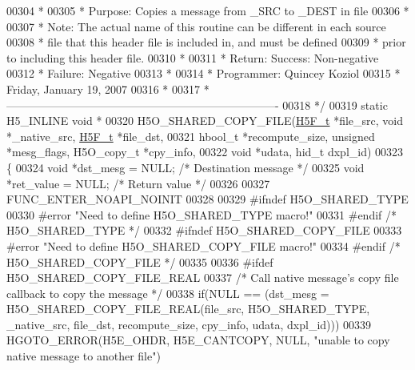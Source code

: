 \begin{DoxyCode}
00304 \textcolor{comment}{ *}
00305 \textcolor{comment}{ * Purpose:     Copies a message from \_SRC to \_DEST in file}
00306 \textcolor{comment}{ *}
00307 \textcolor{comment}{ * Note:    The actual name of this routine can be different in each source}
00308 \textcolor{comment}{ *      file that this header file is included in, and must be defined}
00309 \textcolor{comment}{ *      prior to including this header file.}
00310 \textcolor{comment}{ *}
00311 \textcolor{comment}{ * Return:  Success:    Non-negative}
00312 \textcolor{comment}{ *      Failure:    Negative}
00313 \textcolor{comment}{ *}
00314 \textcolor{comment}{ * Programmer:  Quincey Koziol}
00315 \textcolor{comment}{ *              Friday, January 19, 2007}
00316 \textcolor{comment}{ *}
00317 \textcolor{comment}{ *-------------------------------------------------------------------------}
00318 \textcolor{comment}{ */}
00319 \textcolor{keyword}{static} H5\_INLINE \textcolor{keywordtype}{void} *
00320 H5O\_SHARED\_COPY\_FILE(\hyperlink{struct_h5_f__t}{H5F\_t} *file\_src, \textcolor{keywordtype}{void} *\_native\_src, \hyperlink{struct_h5_f__t}{H5F\_t} *file\_dst,
00321     hbool\_t *recompute\_size, \textcolor{keywordtype}{unsigned} *mesg\_flags, H5O\_copy\_t *cpy\_info,
00322     \textcolor{keywordtype}{void} *udata, hid\_t dxpl\_id)
00323 \{
00324     \textcolor{keywordtype}{void} *dst\_mesg = NULL;      \textcolor{comment}{/* Destination message */}
00325     \textcolor{keywordtype}{void} *ret\_value = NULL;     \textcolor{comment}{/* Return value */}
00326 
00327     FUNC\_ENTER\_NOAPI\_NOINIT
00328 
00329 \textcolor{preprocessor}{#ifndef H5O\_SHARED\_TYPE}
00330 \textcolor{preprocessor}{#error "Need to define H5O\_SHARED\_TYPE macro!"}
00331 \textcolor{preprocessor}{#endif }\textcolor{comment}{/* H5O\_SHARED\_TYPE */}\textcolor{preprocessor}{}
00332 \textcolor{preprocessor}{#ifndef H5O\_SHARED\_COPY\_FILE}
00333 \textcolor{preprocessor}{#error "Need to define H5O\_SHARED\_COPY\_FILE macro!"}
00334 \textcolor{preprocessor}{#endif }\textcolor{comment}{/* H5O\_SHARED\_COPY\_FILE */}\textcolor{preprocessor}{}
00335 
00336 \textcolor{preprocessor}{#ifdef H5O\_SHARED\_COPY\_FILE\_REAL}
00337     \textcolor{comment}{/* Call native message's copy file callback to copy the message */}
00338     \textcolor{keywordflow}{if}(NULL == (dst\_mesg = H5O\_SHARED\_COPY\_FILE\_REAL(file\_src, H5O\_SHARED\_TYPE, \_native\_src, file\_dst, 
      recompute\_size, cpy\_info, udata, dxpl\_id)))
00339         HGOTO\_ERROR(H5E\_OHDR, H5E\_CANTCOPY, NULL, \textcolor{stringliteral}{"unable to copy native message to another file"})

\end{DoxyCode}
